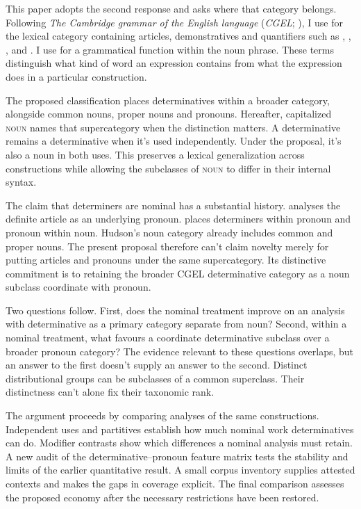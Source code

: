 \documentclass[12pt]{article}
\begin{document}
This paper adopts the second response and asks where that category belongs. Following \textit{The Cambridge grammar of the English language} (\textit{CGEL}; \citealt{huddleston2002}), I use  for the lexical category containing articles, demonstratives and quantifiers such as , , ,  and . I use  for a grammatical function within the noun phrase. These terms distinguish what kind of word an expression contains from what the expression does in a particular construction.

The proposed classification places determinatives within a broader  category, alongside common nouns, proper nouns and pronouns. Hereafter, capitalized \textsc{noun} names that supercategory when the distinction matters. A determinative remains a determinative when it's used independently. Under the proposal, it's also a noun in both uses. This preserves a lexical generalization across constructions while allowing the subclasses of \textsc{noun} to differ in their internal syntax.

The claim that determiners are nominal has a substantial history. \textcite{sommerstein1972} analyses the definite article as an underlying pronoun. \textcite{hudson2004determiners,hudson2010wordgrammar} places determiners within pronoun and pronoun within noun. Hudson's noun category already includes common and proper nouns. The present proposal therefore can't claim novelty merely for putting articles and pronouns under the same supercategory. Its distinctive commitment is to retaining the broader CGEL determinative category as a noun subclass coordinate with pronoun.

Two questions follow. First, does the nominal treatment improve on an analysis with determinative as a primary category separate from noun? Second, within a nominal treatment, what favours a coordinate determinative subclass over a broader pronoun category? The evidence relevant to these questions overlaps, but an answer to the first doesn't supply an answer to the second. Distinct distributional groups can be subclasses of a common superclass. Their distinctness can't alone fix their taxonomic rank.

The argument proceeds by comparing analyses of the same constructions. Independent uses and partitives establish how much nominal work determinatives can do. Modifier contrasts show which differences a nominal analysis must retain. A new audit of the determinative--pronoun feature matrix tests the stability and limits of the earlier quantitative result. A small corpus inventory supplies attested contexts and makes the gaps in coverage explicit. The final comparison assesses the proposed economy after the necessary restrictions have been restored.
\end{document}
